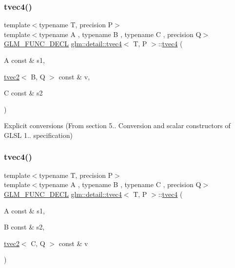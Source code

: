 \subsubsection{\texorpdfstring{tvec4()}{tvec4()}\hspace{0.1cm}{\footnotesize\ttfamily [9/23]}}
{\footnotesize\ttfamily template$<$typename T, precision P$>$ \\
template$<$typename A , typename B , typename C , precision Q$>$ \\
\hyperlink{setup_8hpp_ab2d052de21a70539923e9bcbf6e83a51}{G\+L\+M\+\_\+\+F\+U\+N\+C\+\_\+\+D\+E\+CL} \hyperlink{structglm_1_1detail_1_1tvec4}{glm\+::detail\+::tvec4}$<$ T, P $>$\+::\hyperlink{structglm_1_1detail_1_1tvec4}{tvec4} (\begin{DoxyParamCaption}\item[{A const \&}]{s1,  }\item[{\hyperlink{structglm_1_1detail_1_1tvec2}{tvec2}$<$ B, Q $>$ const \&}]{v,  }\item[{C const \&}]{s2 }\end{DoxyParamCaption})\hspace{0.3cm}{\ttfamily [explicit]}}



Explicit conversions (From section 5.. Conversion and scalar constructors of G\+L\+SL 1.. specification) 

\mbox{\label{structglm_1_1detail_1_1tvec4_a8ef9e52bfba428b34a6503b41d405414}} 
\subsubsection{\texorpdfstring{tvec4()}{tvec4()}\hspace{0.1cm}{\footnotesize\ttfamily [10/23]}}
{\footnotesize\ttfamily template$<$typename T, precision P$>$ \\
template$<$typename A , typename B , typename C , precision Q$>$ \\
\hyperlink{setup_8hpp_ab2d052de21a70539923e9bcbf6e83a51}{G\+L\+M\+\_\+\+F\+U\+N\+C\+\_\+\+D\+E\+CL} \hyperlink{structglm_1_1detail_1_1tvec4}{glm\+::detail\+::tvec4}$<$ T, P $>$\+::\hyperlink{structglm_1_1detail_1_1tvec4}{tvec4} (\begin{DoxyParamCaption}\item[{A const \&}]{s1,  }\item[{B const \&}]{s2,  }\item[{\hyperlink{structglm_1_1detail_1_1tvec2}{tvec2}$<$ C, Q $>$ const \&}]{v }\end{DoxyParamCaption})\hspace{0.3cm}{\ttfamily [explicit]}}



